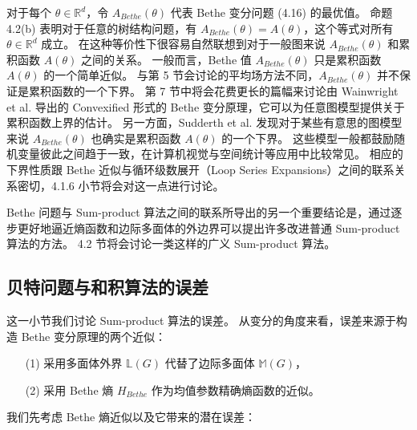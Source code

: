 对于每个 $\theta \in \mathbb{R}^d$，令 $A_{Bethe}(\theta)$ 代表 Bethe 变分问题 (4.16) 的最优值。
命题 4.2(b) 表明对于任意的树结构问题，有 $A_{Bethe}(\theta) = A(\theta)$，这个等式对所有 $\theta \in \mathbb{R}^d$ 成立。
在这种等价性下很容易自然联想到对于一般图来说 $A_{Bethe}(\theta)$ 和累积函数 $A(\theta)$ 之间的关系。
一般而言，Bethe 值 $A_{Bethe}(\theta)$ 只是累积函数 $A(\theta)$ 的一个简单近似。
与第 5 节会讨论的平均场方法不同，$A_{Bethe}(\theta)$ 并不保证是累积函数的一个下界。
第 7 节中将会花费更长的篇幅来讨论由 Wainwright et al. 导出的 Convexified 形式的 Bethe 变分原理，它可以为任意图模型提供关于累积函数上界的估计。
另一方面，Sudderth et al. 发现对于某些有意思的图模型来说 $A_{Bethe}(\theta)$ 也确实是累积函数 $A(\theta)$ 的一个下界。
这些模型一般都鼓励随机变量彼此之间趋于一致，在计算机视觉与空间统计等应用中比较常见。
相应的下界性质跟 Bethe 近似与循环级数展开（Loop Series Expansions）之间的联系关系密切，4.1.6 小节将会对这一点进行讨论。

Bethe 问题与 Sum-product 算法之间的联系所导出的另一个重要结论是，通过逐步更好地逼近熵函数和边际多面体的外边界可以提出许多改进普通 Sum-product 算法的方法。
4.2 节将会讨论一类这样的广义 Sum-product 算法。

\subsection{贝特问题与和积算法的误差}

这一小节我们讨论 Sum-product 算法的误差。
从变分的角度来看，误差来源于构造 Bethe 变分原理的两个近似：

\begin{itemize}
    \item[(1)] 采用多面体外界 $\mathbb{L}(G)$ 代替了边际多面体 $\mathbb{M}(G)$，
    \item[(2)] 采用 Bethe 熵 $H_{Bethe}$ 作为均值参数精确熵函数的近似。
\end{itemize}

我们先考虑 Bethe 熵近似以及它带来的潜在误差：


